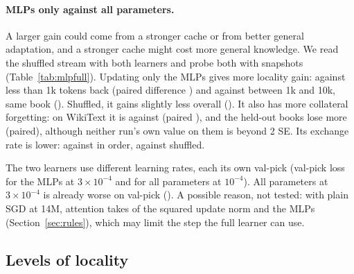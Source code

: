 \documentclass[10pt]{article}
\begin{document}
\paragraph{MLPs only against all parameters.}
A larger gain could come from a stronger cache or from better general adaptation, and a stronger cache might cost more general knowledge.
We read the shuffled stream with both learners and probe both with snapshots (Table~\ref{tab:mlpfull}).
Updating only the MLPs gives more locality gain: \mvfMlpLocOneKPM{} against \mvfFullLocOneKPM{} less than 1k tokens back (paired difference \mvfDiffLocOneKPM{}) and \mvfMlpLocTenKPM{} against \mvfFullLocTenKPM{} between 1k and 10k, same book (\mvfDiffLocTenKPM{}).
Shuffled, it gains slightly less overall (\mvfDiffShuffledAllPM{}).
It also has more collateral forgetting: on WikiText it is \mvfMlpWikiPM{} against \mvfFullWikiPM{} (paired \mvfDiffWikiPM{}), and the held-out books lose \mvfDiffBooksPM{} more (paired), although neither run's own value on them is beyond 2 SE.
Its exchange rate is lower: \mvfMlpExchange{} against \mvfFullExchange{} in order, \mvfMlpExchangeSh{} against \mvfFullExchangeSh{} shuffled.

The two learners use different learning rates, each its own val-pick (val-pick loss \valPickMlp{} for the MLPs at $3\times10^{-4}$ and \valPickAll{} for all parameters at $10^{-4}$).
All parameters at $3\times10^{-4}$ is already worse on val-pick (\valPickAllHigh{}).
A possible reason, not tested: with plain SGD at 14M, attention takes \shareAttnFourteen{} of the squared update norm and the MLPs \shareMlpFourteen{} (Section~\ref{sec:rules}), which may limit the step the full learner can use.

\begin{table}[t]
\centering\footnotesize\setlength{\tabcolsep}{3.5pt}

\caption{Pythia-14M with plain SGD updating only the MLPs or all parameters, each at its own val-pick learning rate. Gain shuffled and locality gain (in order $-$ shuffled) by distance bin, $\pm$ SE over books; collateral forgetting (snapshot $-$ pretrained loss, mean over the second half of the stream) on detokenized WikiText and the 6 held-out books, $\pm$ SE over held-out chunks or books; exchange rate = stream gain / collateral forgetting on WikiText. Last column: paired difference. The in-order gains are in Table~\ref{tab:layers}. $\dagger$: under 2 SE.}
\label{tab:mlpfull}
\end{table}

\subsection{Levels of locality}\label{sec:levels}
\end{document}
